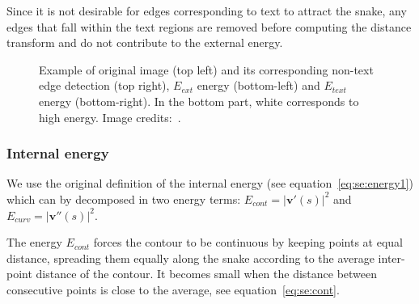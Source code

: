 Since it is not desirable for edges corresponding to text to attract the snake, any edges that fall within the text regions are removed before computing the distance transform and do not contribute to the external energy.
	
	\begin{figure}[!ht]	%
	  \centering
		\caption[Active contour energies for open balloon extraction]{Example of original image (top left) and its corresponding non-text edge detection (top right), $E_{ext}$ energy (bottom-left) and $E_{text}$ energy (bottom-right). In the bottom part, white corresponds to high energy. Image credits:~\cite{Bubble09}. }
		\label{fig:se:distance_transform}
	\end{figure}

\subsubsection{Internal energy}
We use the original definition of the internal energy (see equation~\ref{eq:se:energy1}) which can by decomposed in two energy terms: $E_{cont} = \left|\mathbf{v}'(s) \right|^2$ and $E_{curv}=\left| \mathbf{v}''(s) \right|^2$.
% 

The energy $E_{cont}$ forces the contour to be continuous by keeping points at equal distance, spreading them equally along the snake according to the average inter-point distance of the contour.
It becomes small when the distance between consecutive points is close to the average, see equation~\ref{eq:se:cont}.

